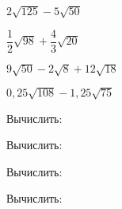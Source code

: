 \begin{class}[number=4]
\begin{listofex}
\begin{enumcols}[itemcolumns=3]
			\item \( 2\sqrt{125}-5\sqrt{50} \)
			\item \( \dfrac{1}{2}\sqrt{98}+\dfrac{4}{3}\sqrt{20} \)
			\item \( 9\sqrt{50}-2\sqrt{8}+12\sqrt{18} \)
			\item \( 0,25\sqrt{108}-1,25\sqrt{75} \)
		\end{enumcols}
		\item Вычислить:
		\begin{enumcols}[itemcolumns=2]
			\item {}
			\item {}
			\item {}
			\item {}
			\item {}
			\item {}
		\end{enumcols}
		\item Вычислить:
		\begin{enumcols}[itemcolumns=2]
			\item {}
			\item {}
			\item {}
			\item {}
		\end{enumcols}
		\item Вычислить:
		\begin{enumcols}[itemcolumns=2]
			\item {}
			\item {}
		\end{enumcols}
		\item Вычислить:
		\begin{enumcols}[itemcolumns=2]
			\item {}
			\item {}
		\end{enumcols}
	\end{listofex}
\end{class}
%
%
%
%
%
